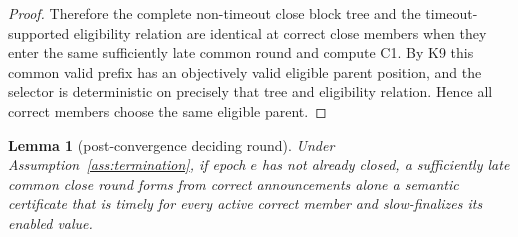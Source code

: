 \documentclass[11pt]{article}
\newtheorem{lemma}[theorem]{Lemma}
\theoremstyle{definition}
\theoremstyle{remark}
\begin{document}
\begin{proof}
Therefore the complete non-timeout close block tree and the timeout-supported eligibility relation are identical at correct close members when they enter the same sufficiently late common round and compute C1. By K9 this common valid prefix has an objectively valid eligible parent position, and the selector is deterministic on precisely that tree and eligibility relation. Hence all correct members choose the same eligible parent.
\end{proof}

\begin{lemma}[post-convergence deciding round]
\label{lem:deciding-round}
Under Assumption~\ref{ass:termination}, if epoch $e$ has not already closed, a sufficiently late common close round forms from correct announcements alone a semantic certificate that is timely for every active correct member and slow-finalizes its enabled value.
\end{lemma}
\end{document}
